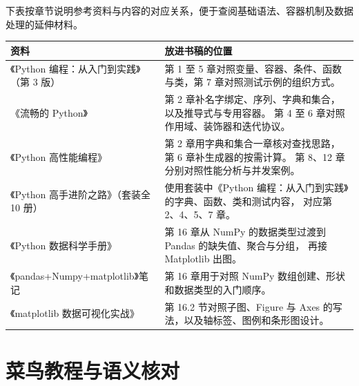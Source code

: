 下表按章节说明参考资料与内容的对应关系，便于查阅基础语法、容器机制及数据处理的延伸材料。

\begin{tabularx}{\textwidth}{@{}>{\raggedright\arraybackslash}p{}
                               >{\raggedright\arraybackslash}X@{}}
  \toprule
  \textbf{资料} & \textbf{放进书稿的位置} \\
  \midrule
  《Python 编程：从入门到实践》（第 3 版） &
    第 1 至 5 章对照变量、容器、条件、函数与类，第 7 章对照测试示例的组织方式。 \\[4pt]
  《流畅的 Python》 &
    第 2 章补名字绑定、序列、字典和集合，以及推导式与专用容器。
    第 4 至 6 章对照作用域、装饰器和迭代协议。 \\[4pt]
  《Python 高性能编程》 &
    第 2 章用字典和集合一章核对查找思路，第 6 章补生成器的按需计算。
    第 8、12 章分别对照性能分析与并发案例。 \\[4pt]
  《Python 高手进阶之路》（套装全 10 册） &
    使用套装中《Python 编程：从入门到实践》的字典、函数、类和测试内容，
    对应第 2、4、5、7 章。 \\[4pt]
  《Python 数据科学手册》 &
    第 16 章从 NumPy 的数据类型过渡到 Pandas 的缺失值、聚合与分组，
    再接 Matplotlib 出图。 \\[4pt]
  《pandas+Numpy+matplotlib》笔记 &
    第 16 章用于对照 NumPy 数组创建、形状和数据类型的入门顺序。 \\[4pt]
  《matplotlib 数据可视化实战》 &
    第 16.2 节对照子图、Figure 与 Axes 的写法，以及轴标签、图例和条形图设计。 \\
  \bottomrule
\end{tabularx}\par

\section*{菜鸟教程与语义核对}

